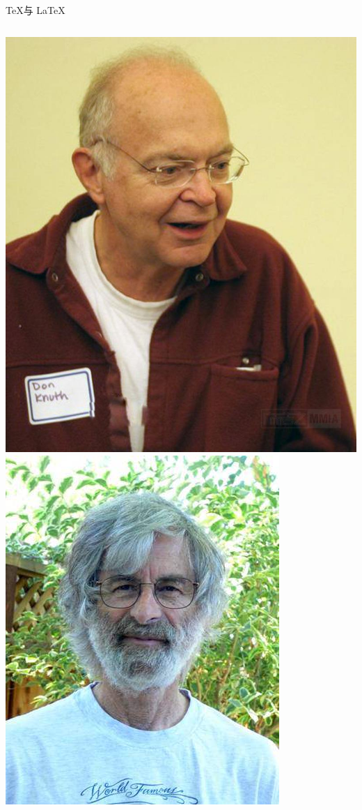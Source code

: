 \documentclass[UTF8,11pt]{beamer}
\begin{document}
\begin{frame}{\TeX 与 \LaTeX}
\begin{columns}
	\includegraphics[scale=0.15]{figure/DK}\\
	\includegraphics[scale=0.28]{figure/LL}
	\end{columns}
\end{frame}
\end{document}
